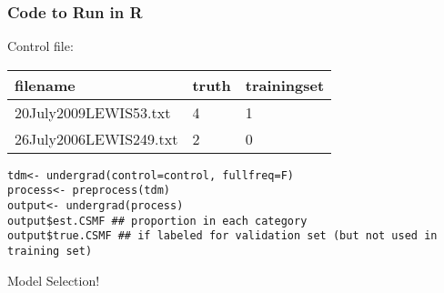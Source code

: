 \documentclass{beamer}
\begin{document}
\begin{frame}
\frametitle{Code to Run in R}





Control file: \\
\begin{tabular}{lll} 
filename & truth & trainingset \\
\hline
20July2009LEWIS53.txt & 4 & \alert{1} \\
26July2006LEWIS249.txt & 2 & \alert{0} \\
\hline
\end{tabular} 



{\tt tdm<- undergrad(control=control, fullfreq=F)  } \\
{\tt process<- preprocess(tdm) } \\
{\tt output<- undergrad(process) } \\
{\tt output\$est.CSMF \#\# proportion in each category} \\
{\tt output\$true.CSMF \#\# if labeled for validation set (but not used in training set) } 



\end{frame}

\begin{frame}

\alert{Model Selection!}

\end{frame}
\end{document}
